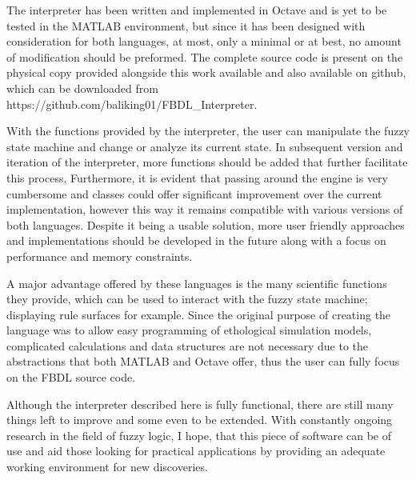 The interpreter has been written and implemented in Octave and is yet to be tested in the MATLAB environment, but since it has been designed with consideration for both languages, at most, only a minimal or at best, no amount of modification should be preformed. The complete source code is present on the physical copy provided alongside this work available and also available on github, which can be downloaded from https://github.com/baliking01/FBDL\_Interpreter.

With the functions provided by the interpreter, the user can manipulate the fuzzy state machine and change or analyze its current state. In subsequent version and iteration of the interpreter, more functions should be added that further facilitate this process, Furthermore, it is evident that passing around the engine is very cumbersome and classes could offer significant improvement over the current implementation, however this way it remains compatible with various versions of both languages. Despite it being a usable solution, more user friendly approaches and implementations should be developed in the future along with a focus on performance and memory constraints.

A major advantage offered by these languages is the many scientific functions they provide, which can be used to interact with the fuzzy state machine; displaying rule surfaces for example. Since the original purpose of creating the language was to allow easy programming of ethological simulation models, complicated calculations and data structures are not necessary due to the abstractions that both MATLAB and Octave offer, thus the user can fully focus on the FBDL source code.

Although the interpreter described here is fully functional, there are still many things left to improve and some even to be extended. With constantly ongoing research in the field of fuzzy logic, I hope, that this piece of software can be of use and aid those looking for practical applications by providing an adequate working environment for new discoveries.